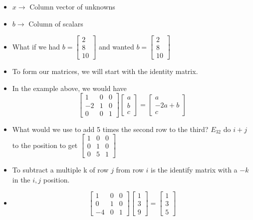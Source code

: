 \begin{itemize}
    \item $x\longrightarrow$ Column vector of unknowns
    \item $b\longrightarrow$ Column of scalars
    \item What if we had $b=\begin{bmatrix}2\\8\\10\end{bmatrix}$ and wanted $b=\begin{bmatrix}2\\8\\10\end{bmatrix}$
    \item To form our matrices, we will start with the identity matrix.
    \item In the example above, we would have $$\begin{bmatrix}1&0&0\\-2&1&0\\0&0&1\end{bmatrix}\begin{bmatrix}a\\b\\c\end{bmatrix}=\begin{bmatrix}a\\-2a+b\\c\end{bmatrix}$$
    \item What would we use to add 5 times the second row to the third? $E_{32}$ do $i+j$ to the position to get $\begin{bmatrix}1&0&0\\0&1&0\\0&5&1\end{bmatrix}$
    \item To subtract a multiple k of row $j$ from row $i$ is the identify matrix with a $-k$ in the $i, j$ position.
    \item $$\begin{bmatrix}1&0&0\\0&1&0\\-4&0&1\end{bmatrix}\begin{bmatrix}1\\3\\9\end{bmatrix}=\begin{bmatrix}1\\3\\5\end{bmatrix}$$

\end{itemize}
